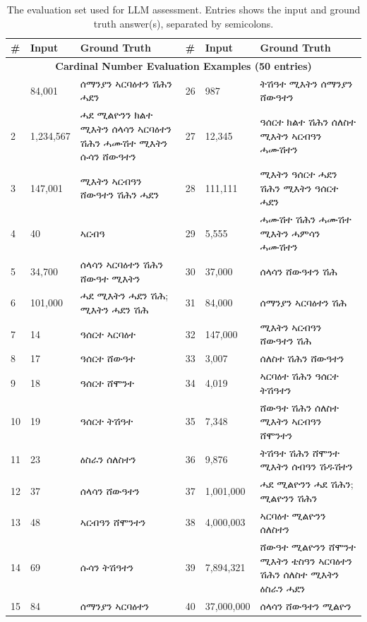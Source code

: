 \documentclass{article}
\newcommand{\ti}[1]{{\geezfont #1}}
\begin{document}
\footnotesize
\begin{longtable}{@{\hspace{1pt}}llp{5.65cm}|llp{5.65cm}@{\hspace{1pt}}}
\caption{The evaluation set used for LLM assessment. Entries shows the input and ground truth answer(s), separated by semicolons.}
\label{tab:eval_set_samples} \\
\toprule
\textbf{\#} & \textbf{Input} & \textbf{Ground Truth} & \textbf{\#} & \textbf{Input} & \textbf{Ground Truth} \\
\midrule
\endhead
\multicolumn{6}{c}{\textbf{Cardinal Number Evaluation Examples (50 entries)}} \\
\addlinespace
1 & 84{,}001 & \ti{ሰማንያን ኣርባዕተን ሽሕን ሓደን} & 26 & 987 & \ti{ትሽዓተ ሚእትን ሰማንያን ሸውዓተን} \\
2 & 1{,}234{,}567 & \ti{ሓደ ሚልዮንን ክልተ ሚእትን ሰላሳን ኣርባዕተን ሽሕን ሓሙሽተ ሚእትን ሱሳን ሸውዓተን} & 27 & 12{,}345 & \ti{ዓሰርተ ክልተ ሽሕን ሰለስተ ሚእትን ኣርብዓን ሓሙሽተን} \\
3 & 147{,}001 & \ti{ሚእትን ኣርብዓን ሸውዓተን ሽሕን ሓደን} & 28 & 111{,}111 & \ti{ሚእትን ዓሰርተ ሓደን ሽሕን ሚእትን ዓሰርተ ሓደን} \\
4 & 40 & \ti{ኣርብዓ} & 29 & 5{,}555 & \ti{ሓሙሽተ ሽሕን ሓሙሽተ ሚእትን ሓምሳን ሓሙሽተን} \\
5 & 34{,}700 & \ti{ሰላሳን ኣርባዕተን ሽሕን ሸውዓተ ሚእትን} & 30 & 37{,}000 & \ti{ሰላሳን ሸውዓተን ሽሕ} \\
6 & 101{,}000 & \ti{ሓደ ሚእትን ሓደን ሽሕ; ሚእትን ሓደን ሽሕ} & 31 & 84{,}000 & \ti{ሰማንያን ኣርባዕተን ሽሕ} \\
7 & 14 & \ti{ዓሰርተ ኣርባዕተ} & 32 & 147{,}000 & \ti{ሚእትን ኣርብዓን ሸውዓተን ሽሕ} \\
8 & 17 & \ti{ዓሰርተ ሸውዓተ} & 33 & 3{,}007 & \ti{ሰለስተ ሽሕን ሸውዓተን} \\
9 & 18 & \ti{ዓሰርተ ሸሞንተ} & 34 & 4{,}019 & \ti{ኣርባዕተ ሽሕን ዓሰርተ ትሽዓተን} \\
10 & 19 & \ti{ዓሰርተ ትሽዓተ} & 35 & 7{,}348 & \ti{ሸውዓተ ሽሕን ሰለስተ ሚእትን ኣርብዓን ሸሞንተን} \\
11 & 23 & \ti{ዕስራን ሰለስተን} & 36 & 9{,}876 & \ti{ትሽዓተ ሽሕን ሸሞንተ ሚእትን ሰብዓን ሽዱሽተን} \\
12 & 37 & \ti{ሰላሳን ሸውዓተን} & 37 & 1{,}001{,}000 & \ti{ሓደ ሚልዮንን ሓደ ሽሕን; ሚልዮንን ሽሕን} \\
13 & 48 & \ti{ኣርብዓን ሸሞንተን} & 38 & 4{,}000{,}003 & \ti{ኣርባዕተ ሚልዮንን ሰለስተን} \\
14 & 69 & \ti{ሱሳን ትሽዓተን} & 39 & 7{,}894{,}321 & \ti{ሸውዓተ ሚልዮንን ሸሞንተ ሚእትን ቴስዓን ኣርባዕተን ሽሕን ሰለስተ ሚእትን ዕስራን ሓደን} \\
15 & 84 & \ti{ሰማንያን ኣርባዕተን} & 40 & 37{,}000{,}000 & \ti{ሰላሳን ሸውዓተን ሚልዮን} \\

\end{longtable}
\end{document}
